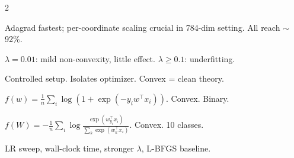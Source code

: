 \documentclass[a4paper,9pt]{article}
\begin{document}
\begin{multicols}{2}
\begin{tcolorbox}[title=\textbf{MNIST Result}, colback=white]
Adagrad fastest; per-coordinate scaling crucial in 784-dim setting. All reach \(\sim\)92\%.
\end{tcolorbox}

\begin{tcolorbox}[title=\textbf{Non-Convex Regularizer}, colback=white]
\(\lambda=0.01\): mild non-convexity, little effect. \(\lambda \geq 0.1\): underfitting.
\end{tcolorbox}

\begin{tcolorbox}[title=\textbf{Why Linear Models?}, colback=white]
Controlled setup. Isolates optimizer. Convex = clean theory.
\end{tcolorbox}

\begin{tcolorbox}[title=\textbf{Logistic Loss (A9a)}, colback=white]
\(f(w) = \frac{1}{n}\sum_i \log(1+\exp(-y_i w^\top x_i))\). Convex. Binary.
\end{tcolorbox}

\begin{tcolorbox}[title=\textbf{Softmax Loss (MNIST)}, colback=white]
\(f(W) = -\frac{1}{n}\sum_i \log \frac{\exp(w_{y_i}^\top x_i)}{\sum_k \exp(w_k^\top x_i)}\). Convex. 10 classes.
\end{tcolorbox}

\begin{tcolorbox}[title=\textbf{Outlook}, colback=white]
LR sweep, wall-clock time, stronger \(\lambda\), L-BFGS baseline.
\end{tcolorbox}

\end{multicols}
\end{document}
